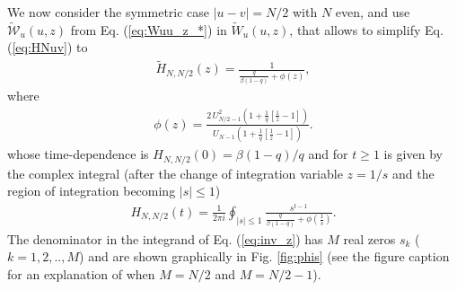 \documentclass[idelinks, superscriptaddress, amsmath, amssymb, aps, pre]{revtex4-2}
\begin{document}
We now consider  the symmetric case $|u-v|=N/2$ with $N$ even, and use $\widetilde{\mathcal{W}}_{u}(u,z)$ from Eq. (\ref{eq:Wuu_z_*}) in $\widetilde{W}_{u}(u,z)$, that allows to simplify Eq. (\ref{eq:HNuv}) to
 \begin{align}
 \widetilde{H}_{N,N/2}(z)=\frac{1}{\frac{q}{\beta(1-q)}+\phi(z)},
\label{eq:HNN2_}
\end{align}
where
\begin{align}
\phi(z)=\frac{2\,U^2_{N/2-1}\left(1+\frac{1}{q}\left[\frac{1}{z}-1\right]\right)}{U_{N-1}\left(1+\frac{1}{q}\left[\frac{1}{z}-1\right]\right)}.
\label{eq:phi_s}
\end{align}
whose time-dependence is $H_{N,N/2}(0)= \beta(1-q)/q$ and for $t\geq 1$ is given by the complex integral (after the change of integration variable $z=1/s$ and the region of integration becoming $|s|\leq 1$)
\begin{align}
 H_{N,N/2}(t)=\frac{1}{2\pi i}\oint_{|s|\leq 1}\frac{s^{t-1}}{\frac{q}{\beta(1-q)}+\phi\left(\frac{1}{s}\right)}.
\label{eq:inv_z}
\end{align}
The denominator in the integrand of Eq. (\ref{eq:inv_z}) has $M$ real zeros $s_k$ ($k=1,2,..,M$) and are shown graphically in Fig. \ref{fig:phis} (see the figure caption for an explanation of when $M=N/2$ and $M=N/2-1$). 
\end{document}
